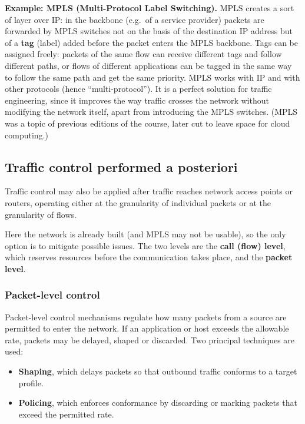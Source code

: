 \documentclass[11pt,a4paper,openany]{report}
\begin{document}
\textbf{Example: MPLS (Multi-Protocol Label Switching).} MPLS creates a sort of layer over IP: in the backbone (e.g.\ of a service provider) packets are forwarded by MPLS switches not on the basis of the destination IP address but of a \textbf{tag} (label) added before the packet enters the MPLS backbone. Tags can be assigned freely: packets of the same flow can receive different tags and follow different paths, or flows of different applications can be tagged in the same way to follow the same path and get the same priority. MPLS works with IP and with other protocols (hence ``multi-protocol''). It is a perfect solution for traffic engineering, since it improves the way traffic crosses the network without modifying the network itself, apart from introducing the MPLS switches. (MPLS was a topic of previous editions of the course, later cut to leave space for cloud computing.)

\subsection{Traffic control performed a posteriori}

Traffic control may also be applied after traffic reaches network access points or routers, operating either at the granularity of individual packets or at the granularity of flows.

Here the network is already built (and MPLS may not be usable), so the only option is to mitigate possible issues. The two levels are the \textbf{call (flow) level}, which reserves resources before the communication takes place, and the \textbf{packet level}.

\subsubsection*{Packet-level control}

Packet-level control mechanisms regulate how many packets from a source are permitted to enter the network. If an application or host exceeds the allowable rate, packets may be delayed, shaped or discarded. Two principal techniques are used:

\begin{itemize}
\item \textbf{Shaping}, which delays packets so that outbound traffic conforms to a target profile.
\item \textbf{Policing}, which enforces conformance by discarding or marking packets that exceed the permitted rate.
\end{itemize}
\end{document}
